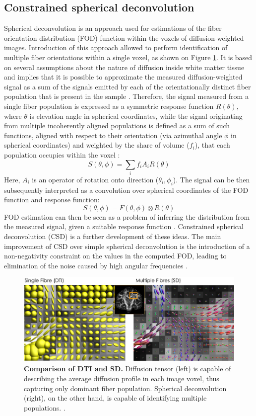 \documentclass[thesis.tex]{subfiles}
\begin{document}
\subsection{Constrained spherical deconvolution}
Spherical deconvolution is an approach used for estimations of the fiber orientation distribution (FOD) function within the voxels of diffusion-weighted images. Introduction of this approach allowed to perform identification of multiple fiber orientations within a single voxel, as shown on Figure \ref{fig:sd-is-good}. It is based on several assumptions about the nature of diffusion inside white matter tissue and implies that it is possible to approximate the measured diffusion-weighted signal as a sum of the signals emitted by each of the orientationally distinct fiber population that is present in the sample \cite{csd1TOURNIER}. Therefore, the signal measured from a single fiber population is expressed as a symmetric response function $R(\theta)$, where $\theta$ is elevation angle in spherical coordinates, while the signal originating from multiple incoherently aligned populations is defined as a sum of such functions, aligned with respect to their orientation (via azimuthal angle $\phi$ in spherical coordinates) and weighted by the share of volume ($f_{i}$), that each population occupies within the voxel \cite{csd1TOURNIER}: \[S(\theta, \phi) = \sum_{i}f_{i}A_{i}R(\theta)\]
Here, $A_{i}$ is an operator of rotation onto direction ($\theta_{i}, \phi_{i}$). The signal can be then subsequently interpreted as a convolution over spherical coordinates of the FOD function and response function:
\[S(\theta, \phi) = F(\theta, \phi) \otimes R(\theta)\]
FOD estimation can then be seen as a problem of inferring the distribution from the measured signal, given a suitable response function \cite{csdDellAcqua2019}. Constrained spherical deconvolution (CSD) is a further development of these ideas. The main improvement of CSD over simple spherical deconvolution is the introduction of a non-negativity constraint on the values in the computed FOD, leading to elimination of the noise caused by high angular frequencies \cite{dwi2fod2-csd}.

\begin{figure}
\centering
\includegraphics[width=14cm,keepaspectratio]{thesis_radomskyi/images/sd-is-good.png}
\caption{\textbf{Comparison of DTI and SD.} Diffusion tensor (left) is capable of describing the average diffusion profile in each image voxel, thus capturing only dominant fiber population. Spherical deconvolution (right), on the other hand, is capable of identifying multiple populations. \cite{csdDellAcqua2019}.}
\label{fig:sd-is-good}
\end{figure}
\end{document}
